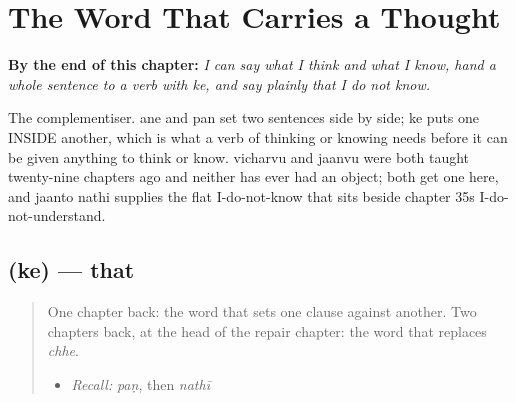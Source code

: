 
\chapter{The Word That Carries a Thought}
\label{ch:gu-that-clause}

\begin{chapteropening}
\textbf{By the end of this chapter:} \emph{I can say what I think and what I know, hand a whole sentence to a verb with ke, and say plainly that I do not know.}

The complementiser. ane and pan set two sentences side by side; ke puts one INSIDE another, which is what a verb of thinking or knowing needs before it can be given anything to think or know. vicharvu and jaanvu were both taught twenty-nine chapters ago and neither has ever had an object; both get one here, and jaanto nathi supplies the flat I-do-not-know that sits beside chapter 35s I-do-not-understand.
\end{chapteropening}

\section[\texorpdfstring{\gu{કે} (ke)}{કે (ke)}]{ (ke) — that}

\label{lesson:GU-C33-ke}



\begin{quote}
One chapter back: the word that sets one clause against another. Two chapters back, at the head of the repair chapter: the word that replaces \emph{chhe}.

\begin{itemize}
\raggedright
  \item \emph{Recall:} \emph{paṇ}, then \emph{nathī}
\end{itemize}
\end{quote}

